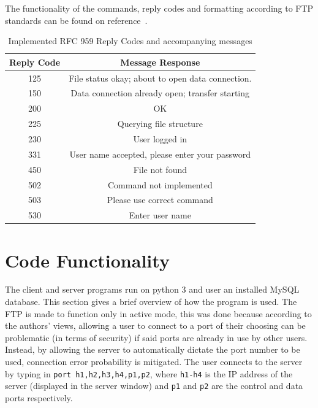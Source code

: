 \documentclass[journal, a4paper]{IEEEtran}
\begin{document}
The functionality of the commands, reply codes and formatting according to FTP standards can be found on reference~\cite{rfc959}.

\begin{table}[htbp]
  \centering
  \caption{Implemented RFC 959 Reply Codes and accompanying messages}
    \begin{tabular}{|c|c|}
    \hline
    \multicolumn{1}{|l|}{\textbf{Reply Code}} & \textbf{Message Response} \\
    \hline
    125   & File status okay; about to open data connection. \\
    \hline
    150   & Data connection already open; transfer starting \\
    \hline
    200   & OK \\
    \hline
    225   & Querying file structure \\
    \hline
    230   & User logged in \\
    \hline
    331   & User name accepted, please enter your password \\
    \hline
    450   & File not found \\
    \hline
    502   & Command not implemented \\
    \hline
    503   & Please use correct command \\
    \hline
    530   & Enter user name \\
    \hline
    \end{tabular}%
  \label{replycodes}%
\end{table}%


\section{Code Functionality}
The client and server programs run on python 3 and user an installed MySQL database. This section gives a brief overview of how the program is used.
The FTP is made to function only in active mode, this was done because according to the authors’ views, allowing a user to connect to a port of their choosing can be problematic (in terms of security) if said ports are already in use by other users. Instead, by allowing the server to automatically dictate the port number to be used, connection error probability is mitigated. The user connects to the server by typing in \texttt{port h1,h2,h3,h4,p1,p2}, where \texttt{h1-h4} is the IP address of the server (displayed in the server window) and \texttt{p1} and \texttt{p2} are the control and data ports respectively.
\end{document}
